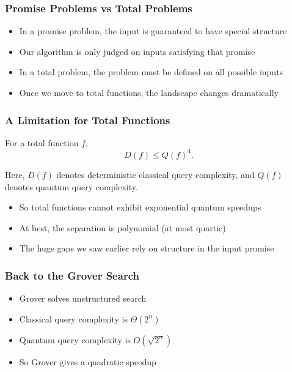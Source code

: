 \documentclass[xcolor=table]{beamer}
\theoremstyle{remark}
\theoremstyle{plain}
\begin{document}
\begin{frame}
  \frametitle{Promise Problems vs Total Problems}
  \begin{itemize}[<+->]
    \item In a promise problem, the input is guaranteed to have special structure
    \item Our algorithm is only judged on inputs satisfying that promise
    \item In a total problem, the problem must be defined on all possible inputs
    \item Once we move to total functions, the landscape changes dramatically
  \end{itemize}
\end{frame}

\begin{frame}
  \frametitle{A Limitation for Total Functions}
  \begin{theorem}
    For a total function $f$,
    \[
      D(f) \le Q(f)^4.
    \]
  \end{theorem}

  \vspace{0.5cm}

  {\small
  Here, $D(f)$ denotes deterministic classical query complexity, and $Q(f)$ denotes quantum query complexity.
  }

  \vspace{0.4cm}

  \begin{itemize}
    \item So total functions cannot exhibit exponential quantum speedups
    \item At best, the separation is polynomial (at most quartic)
    \item The huge gaps we saw earlier rely on structure in the input promise
  \end{itemize}
\end{frame}

\begin{frame}
  \frametitle{Back to the Grover Search}
  \begin{itemize}[<+->]
    \item Grover solves unstructured search
    \item Classical query complexity is $\Theta(2^n)$
    \item Quantum query complexity is $O(\sqrt{2^n})$
    \item So Grover gives a quadratic speedup
  \end{itemize}

  \vspace{0.5cm}

\end{frame}
\end{document}
